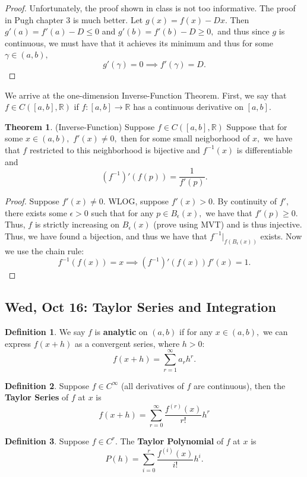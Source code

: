 \documentclass[10pt, oneside]{article}
\newcommand{\bbR}{\mathbb{R}}
\theoremstyle{definition}
\newtheorem{thm}{Theorem}
\newtheorem{defn}{Definition}
\begin{document}
\begin{proof}
    Unfortunately, the proof shown in class is not too informative. The proof in Pugh chapter 3 is much better. Let $g(x) = f(x) - Dx.$ Then $g'(a) = f'(a) - D \leq 0$ and $g'(b) = f'(b) - D \geq 0,$ and thus since $g$ is continuous, we must have that it achieves its minimum and thus for some $\gamma\in (a,b),$ \[g'(\gamma) = 0 \implies f'(\gamma) = D.\]
\end{proof}
We arrive at the one-dimension Inverse-Function Theorem. First, we say that $f\in C([a,b],\bbR)$ if $f:[a,b]\to \bbR$ has a continuous  derivative on $[a,b].$
\begin{thm}
    (Inverse-Function) Suppose $f\in C([a,b], \bbR)$ Suppose that for some $x\in (a,b),$ $f'(x)\neq 0,$ then for some small neigborhood of $x,$ we have that $f$ restricted to this neighborhood is bijective and $f^{-1}(x)$ is differentiable and 
    \[(f^{-1})'(f(p)) = \frac{1}{f'(p)}.\]
\end{thm}
\begin{proof}
    Suppose $f'(x) \neq 0.$ WLOG, suppose $f'(x)>0.$ By continuity of $f',$ there exists some $\epsilon>0$ such that for any $p \in B_\epsilon(x),$ we have that $f'(p)\geq 0.$ Thus, $f$ is strictly increasing on $B_\epsilon(x)$ (prove using MVT) and is thus injective. Thus, we have found a bijection, and thus we have that $f^{-1}|_{f(B_\epsilon(x))}$ exists. Now we use the chain rule:
    \[f^{-1}(f(x)) = x \implies (f^{-1})'(f(x))f'(x) = 1.\]
\end{proof}

\newpage
\subsection{Wed, Oct 16: Taylor Series and Integration}

\begin{defn}
   We say $f$ is \textbf{analytic} on $(a,b)$ if for any $x\in (a,b),$ we can express $f(x + h)$ as a convergent series, where $h>0:$
\[f(x + h) = \sum_{r=1}^\infty a_r h^r.\] 
\end{defn}

\begin{defn}
    Suppose $f\in C^\infty$ (all derivatives of $f$ are continuous), then the \textbf{Taylor Series} of $f$ at $x$ is 
    \[f(x + h) = \sum_{r=0}^\infty \frac{f^{(r)}(x)}{r!}h^{r}\]
\end{defn}

\begin{defn}
    Suppose $f\in C^r.$ The \textbf{Taylor Polynomial} of $f$ at $x$ is 
    \[P(h) = \sum_{i=0}^r \frac{f^{(i)}(x)}{i!}h^{i}.\]
\end{defn}
\end{document}
